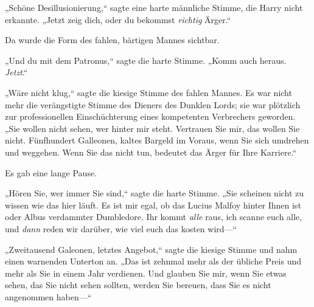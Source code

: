 „Schöne Desillusionierung,“ sagte eine harte männliche Stimme, die Harry nicht erkannte. „Jetzt zeig dich, oder du bekommst \emph{richtig} Ärger.“

Da wurde die Form des fahlen, bärtigen Mannes sichtbar.

„Und du mit dem Patronus,“ sagte die harte Stimme. „Komm auch heraus. \emph{Jetzt}.“

„Wäre nicht klug,“ sagte die kiesige Stimme des fahlen Mannes. Es war nicht mehr die verängstigte Stimme des Dieners des Dunklen Lords; sie war plötzlich zur professionellen Einschüchterung eines kompetenten Verbrechers geworden. „Sie wollen nicht sehen, wer hinter mir steht. Vertrauen Sie mir, das wollen Sie nicht. Fünfhundert Galleonen, kaltes Bargeld im Voraus, wenn Sie sich umdrehen und weggehen. Wenn Sie das nicht tun, bedeutet das Ärger für Ihre Karriere.“

Es gab eine lange Pause.

„Hören Sie, wer immer Sie sind,“ sagte die harte Stimme. „Sie scheinen nicht zu wissen wie das hier läuft. Es ist mir egal, ob das Lucius Malfoy hinter Ihnen ist oder Albus verdammter Dumbledore. Ihr kommt \emph{alle} raus, ich scanne euch alle, und \emph{dann} reden wir darüber, wie viel euch das kosten wird—“

„Zweitausend Galeonen, letztes Angebot,“ sagte die kiesige Stimme und nahm einen warnenden Unterton an. „Das ist zehnmal mehr als der übliche Preis und mehr als Sie in einem Jahr verdienen. Und glauben Sie mir, wenn Sie etwas sehen, das Sie nicht sehen sollten, werden Sie bereuen, dass Sie es nicht angenommen haben—“

